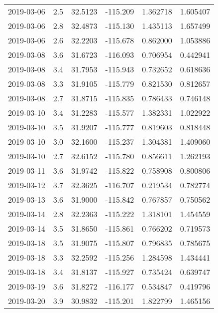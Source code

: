 \begin{tabular}{lrrrrr}
2019-03-06 &       2.5 &  32.5123 &  -115.209 &         1.362718 &         1.605407 \\
2019-03-06 &       2.8 &  32.4873 &  -115.130 &         1.435113 &         1.657499 \\
2019-03-06 &       2.6 &  32.2203 &  -115.678 &         0.862000 &         1.053886 \\
2019-03-08 &       3.6 &  31.6723 &  -116.093 &         0.706954 &         0.442941 \\
2019-03-08 &       3.4 &  31.7953 &  -115.943 &         0.732652 &         0.618636 \\
2019-03-08 &       3.3 &  31.9105 &  -115.779 &         0.821530 &         0.812657 \\
2019-03-08 &       2.7 &  31.8715 &  -115.835 &         0.786433 &         0.746148 \\
2019-03-10 &       3.4 &  31.2283 &  -115.577 &         1.382331 &         1.022922 \\
2019-03-10 &       3.5 &  31.9207 &  -115.777 &         0.819603 &         0.818448 \\
2019-03-10 &       3.0 &  32.1600 &  -115.237 &         1.304381 &         1.409060 \\
2019-03-10 &       2.7 &  32.6152 &  -115.780 &         0.856611 &         1.262193 \\
2019-03-11 &       3.6 &  31.9742 &  -115.822 &         0.758908 &         0.800806 \\
2019-03-12 &       3.7 &  32.3625 &  -116.707 &         0.219534 &         0.782774 \\
2019-03-13 &       3.6 &  31.9000 &  -115.842 &         0.767857 &         0.750562 \\
2019-03-14 &       2.8 &  32.2363 &  -115.222 &         1.318101 &         1.454559 \\
2019-03-14 &       3.5 &  31.8650 &  -115.861 &         0.766202 &         0.719573 \\
2019-03-18 &       3.5 &  31.9075 &  -115.807 &         0.796835 &         0.785675 \\
2019-03-18 &       3.3 &  32.2592 &  -115.256 &         1.284598 &         1.434441 \\
2019-03-18 &       3.4 &  31.8137 &  -115.927 &         0.735424 &         0.639747 \\
2019-03-19 &       3.6 &  31.8272 &  -116.177 &         0.534847 &         0.419796 \\
2019-03-20 &       3.9 &  30.9832 &  -115.201 &         1.822799 &         1.465156 \\

\end{tabular}
